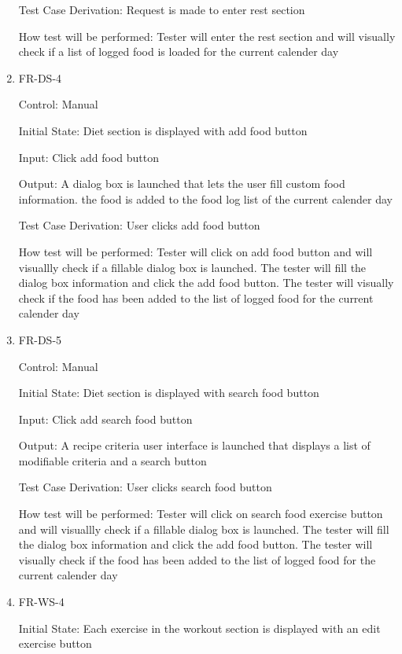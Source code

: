 \documentclass[12pt, titlepage]{article}
\begin{document}
\begin{enumerate}
Test Case Derivation: Request is made to enter rest section

How test will be performed: Tester will enter the rest section and will visually check if a list of logged food is loaded for the current calender day
					
\item{FR-DS-4 \\}

Control: Manual
					
Initial State: Diet section is displayed with add food button
					
Input: Click add food button
					
Output: A dialog box is launched that lets the user fill custom food information. the food is added to the food log list of the current calender day

Test Case Derivation: User clicks add food button

How test will be performed: Tester will click on add food button and will visuallly check if a fillable dialog box is launched. The tester will fill the dialog box information and click the add food button. The tester will visually check if the food has been added to the list of logged food for the current calender day

\item{FR-DS-5\\}

Control: Manual
					
Initial State: Diet section is displayed with search food button
					
Input: Click add search food button
					
Output: A recipe criteria user interface is launched that displays a list of modifiable criteria and a search button

Test Case Derivation: User clicks search food button

How test will be performed: Tester will click on search food exercise button and will visuallly check if a fillable dialog box is launched. The tester will fill the dialog box information and click the add food button. The tester will visually check if the food has been added to the list of logged food for the current calender day

\item{FR-WS-4\\}

Initial State: Each exercise in the workout section is displayed with an edit exercise button
					

\end{enumerate}
\end{document}
